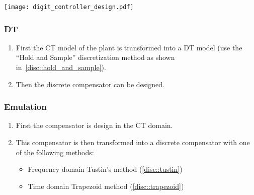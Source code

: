 \begin{center}
    \texttt{[image: digit\_controller\_design.pdf]}
\end{center}

\subsubsection{DT}
\begin{enumerate}
    \item First the CT model of the plant is transformed into a DT model (use the ``Hold and Sample'' discretization method as shown in~\ref{disc::hold_and_sample}).
    \item Then the discrete compensator can be designed.
\end{enumerate}

\subsubsection{Emulation}
\begin{enumerate}
    \item First the compensator is design in the CT domain.
    \item This compensator is then transformed into a discrete compensator with one of the following methods:
          \begin{itemize}
              \item Frequency domain \textrightarrow{} Tustin's method (\ref{disc::tustin})
              \item Time domain \textrightarrow{} Trapezoid method (\ref{disc::trapezoid})
          \end{itemize}
\end{enumerate}
